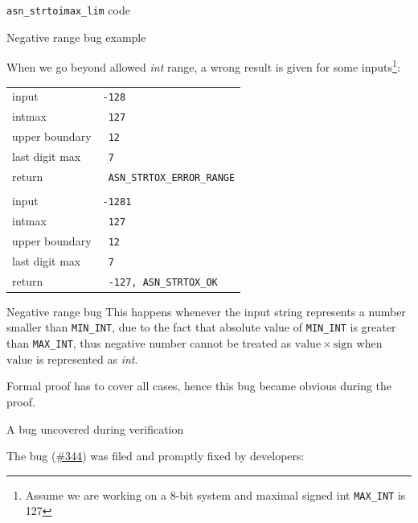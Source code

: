 \documentclass[10pt,usenames,dvipsnames,landscape]{beamer}
\begin{document}
\begin{frame}{\texttt{asn\_strtoimax\_lim} code}
  
  {\fontsize{4}{1}\selectfont  }
  
\end{frame}


\begin{frame}{Negative range bug example}

When we go beyond allowed \textit{int} range, a wrong result is given for some inputs\footnote{Assume we are working on a 8-bit system and maximal signed int \texttt{MAX\_INT} is 127}:  

\begin{table}[]
    \centering
    \begin{tabular}{l|l}
input & \texttt{-128} \\
intmax & \texttt{\ 127}\\
upper boundary& \texttt{\ 12} \\
last digit max& \texttt{\ 7}\\
return & \color{green}\texttt{\ ASN\_STRTOX\_ERROR\_RANGE}\\
\hline \\
input & \texttt{-1281} \\
intmax & \texttt{\ 127}\\
upper boundary& \texttt{\ 12} \\
last digit max& \texttt{\ 7}\\
return & \color{red}\texttt{\ -127, ASN\_STRTOX\_OK}\\
    \end{tabular}
\end{table}

\end{frame}

\begin{frame}{Negative range bug}
    This happens whenever the input string represents a number smaller than \texttt{MIN\_INT}, due to the fact that absolute value of \texttt{MIN\_INT} is greater than \texttt{MAX\_INT}, thus negative number cannot be treated as $\mathrm{value}\times\mathrm{sign}$ when $\mathrm{value}$ is represented as \textit{int}. 
    
    Formal proof has to cover all cases, hence this bug became obvious during the proof.
    
\end{frame}{}

\begin{frame}{A bug uncovered during verification}

  The bug (\href{https://github.com/vlm/asn1c/issues/344}{\#344}) was filed and promptly fixed by developers:
  
  {\fontsize{5}{2}\selectfont }

\end{frame}
\end{document}
